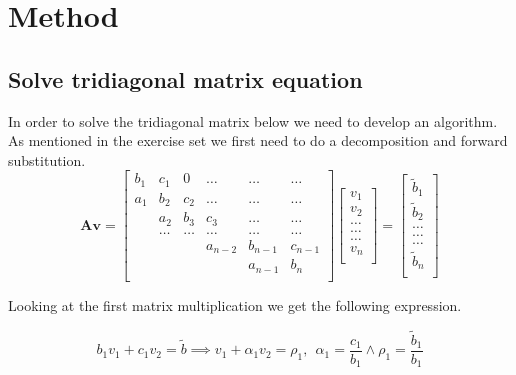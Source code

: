\documentclass[reprint, english,notitlepage]{revtex4-1}  %
\begin{document}
\section{Method}



\subsection{Solve tridiagonal matrix equation}

In order to solve the tridiagonal matrix below we need to develop an algorithm. As mentioned in the exercise set \citep{oppgavetekst} we first need to do a decomposition and forward substitution.
\begin{equation}
\mathbf{A}\mathbf{v} = \begin{bmatrix}
b_1& c_1 & 0 &\dots   & \dots &\dots \\
a_1 & b_2 & c_2 &\dots &\dots &\dots \\
& a_2 & b_3 & c_3 & \dots & \dots \\
& \dots   & \dots &\dots   &\dots & \dots \\
&   &  &a_{n-2}  &b_{n-1}& c_{n-1} \\
&    &  &   &a_{n-1} & b_n \\
\end{bmatrix}\begin{bmatrix}
v_1\\
v_2\\
\dots \\
\dots  \\
\dots \\
v_n\\
\end{bmatrix}
=\begin{bmatrix}
\tilde{b}_1\\
\tilde{b}_2\\
\dots \\
\dots \\
\dots \\
\tilde{b}_n\\
\end{bmatrix}
\label{eq:mat_gen}
\end{equation}

Looking at the first matrix multiplication we get the following expression.

\begin{equation}
	b_1 v_1 + c_1 v_2 = \tilde{b} \implies v_1 + \alpha_1 v_2 = \rho _1, \ \ \alpha_1 = \frac{c_1}{b_1} \wedge \rho_1 = \frac{\tilde{b}_1}{b_1}
	\label{eq:mat1}
\end{equation}
\end{document}
